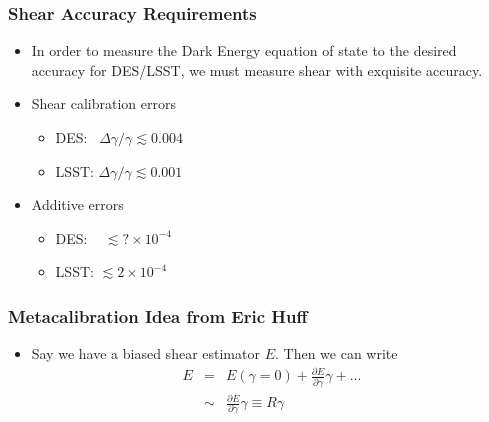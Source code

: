 \documentclass{beamer}
\begin{document}
\frame
{
    \frametitle{Shear Accuracy Requirements}

 
    \begin{itemize}

        \item In order to measure the Dark Energy equation of state
            to the desired accuracy for DES/LSST, we must measure
            shear with exquisite accuracy.

        \item Shear calibration errors
            \begin{itemize}
            
                \item {\color{lightskyblue} DES}:~ $\Delta \gamma/\gamma \lesssim 0.004$
                \item {\color{brightred} LSST}: $\Delta \gamma/\gamma \lesssim 0.001$

            \end{itemize}

        \item Additive errors
            \begin{itemize}
            
                \item {\color{lightskyblue} DES}: ~ $\lesssim ? \times 10^{-4}$
                \item {\color{brightred} LSST}: $\lesssim 2 \times 10^{-4}$

            \end{itemize}


    \end{itemize}

}



\frame
{
    \frametitle{Metacalibration Idea from Eric Huff}

 
    \begin{itemize}

        \item Say we have a biased shear estimator {\color{gold} $E$}.  Then we can write
            {\color{gold}
                \begin{eqnarray}
                    E & = & E(\gamma=0) + \frac{\partial E}{\partial \gamma} \gamma + ... \nonumber \\
                      & \sim &  \frac{\partial E}{\partial \gamma} \gamma \equiv R \gamma \nonumber 
                \end{eqnarray}
            } 
    \end{itemize}
}
\end{document}
